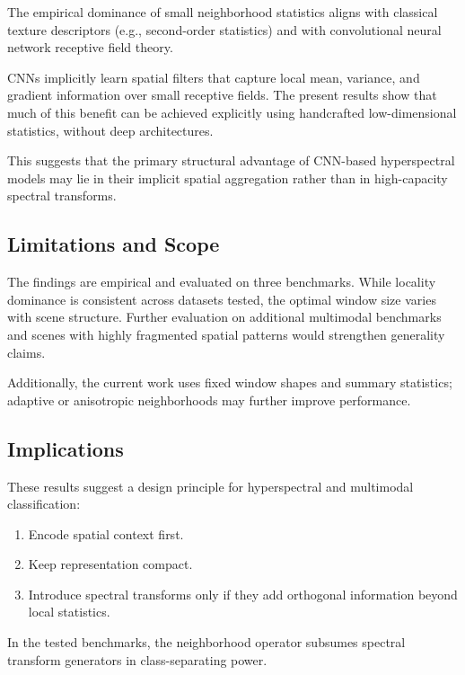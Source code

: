 \documentclass[
  journal]{IEEEtran}
\providecommand{\tightlist}{%
  \setlength{\itemsep}{0pt}\setlength{\parskip}{0pt}}
\begin{document}
The empirical dominance of small neighborhood statistics aligns with
classical texture descriptors (e.g., second-order statistics) and with
convolutional neural network receptive field theory.

CNNs implicitly learn spatial filters that capture local mean, variance,
and gradient information over small receptive fields. The present
results show that much of this benefit can be achieved explicitly using
handcrafted low-dimensional statistics, without deep architectures.

This suggests that the primary structural advantage of CNN-based
hyperspectral models may lie in their implicit spatial aggregation
rather than in high-capacity spectral transforms.

\subsection{Limitations and Scope}\label{limitations-and-scope}

The findings are empirical and evaluated on three benchmarks. While
locality dominance is consistent across datasets tested, the optimal
window size varies with scene structure. Further evaluation on
additional multimodal benchmarks and scenes with highly fragmented
spatial patterns would strengthen generality claims.

Additionally, the current work uses fixed window shapes and summary
statistics; adaptive or anisotropic neighborhoods may further improve
performance.

\subsection{Implications}\label{implications}

These results suggest a design principle for hyperspectral and
multimodal classification:

\begin{enumerate}
\def\labelenumi{\arabic{enumi}.}
\tightlist
\item
  Encode spatial context first.
\item
  Keep representation compact.
\item
  Introduce spectral transforms only if they add orthogonal information
  beyond local statistics.
\end{enumerate}

In the tested benchmarks, the neighborhood operator subsumes spectral
transform generators in class-separating power.
\end{document}
